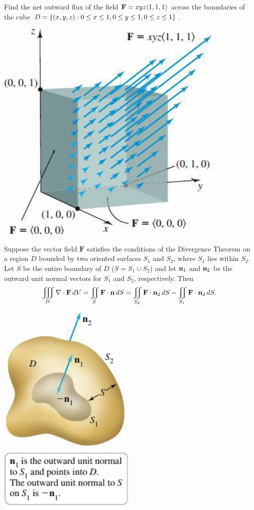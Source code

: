\documentclass[../mathNotesPreamble]{subfiles}
\begin{document}
  \begin{ex*}
    Find the net outward flux of the field $\mathbf F=xyz{\left\langle 1,1,1 \right\rangle}$ across the boundaries of the cube $D={\left\{(x,y,z): 0\leq x\leq 1, 0\leq y\leq 1, 0\leq z\leq 1\right\}}$.
  \end{ex*}
  \begin{flushright}
    \includegraphics[width=0.35\linewidth]{../images/briggs_17_08/fig17_69}
  \end{flushright}
  \pagebreak

  \begin{thmBox*}
    Suppose the vector field $\mathbf F$ satisfies the conditions of the Divergence Theorem on a region $D$ bounded by two oriented surfaces $S_1$ and $S_2$, where $S_1$ lies within $S_2$. Let $S$ be the entire boundary of $D$ ($S=S_1\cup S_2$) and let ${\mathbf{n}}_1$ and ${\mathbf{n}}_2$ be the outward unit normal vectors for $S_1$ and $S_2$, respectively. Then
      \[\iiint\limits_D \nabla\cdot\mathbf F\,dV = \iint\limits_S \mathbf F\cdot{\mathbf{n}}\,dS = \iint\limits_{S_2} \mathbf F\cdot{\mathbf{n}}_2\,dS-\iint\limits_{S_1}\mathbf F\cdot{\mathbf{n}}_2\,dS.\]
  \end{thmBox*}
  \begin{center}
    \includegraphics[width=0.3\linewidth]{../images/briggs_17_08/fig17_72}
  \end{center}
  \pagebreak
\end{document}
